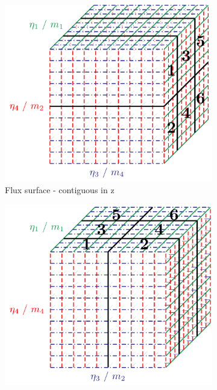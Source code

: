 \begin{figure}[ht]
 \begin{center}
 \begin{subfigure}[t]{.45\textwidth}
  \includegraphics[width=\textwidth]{Figs/ParallelDivision/FluxSurface}
  \caption{\label{fig::FluxSurface}Flux surface - contiguous in z}
 \end{subfigure}
 \hspace{.05\textwidth}
 \begin{subfigure}[t]{.45\textwidth}
  \includegraphics[width=\textwidth]{Figs/ParallelDivision/VParSurface}

\end{subfigure}
\end{center}
\end{figure}
